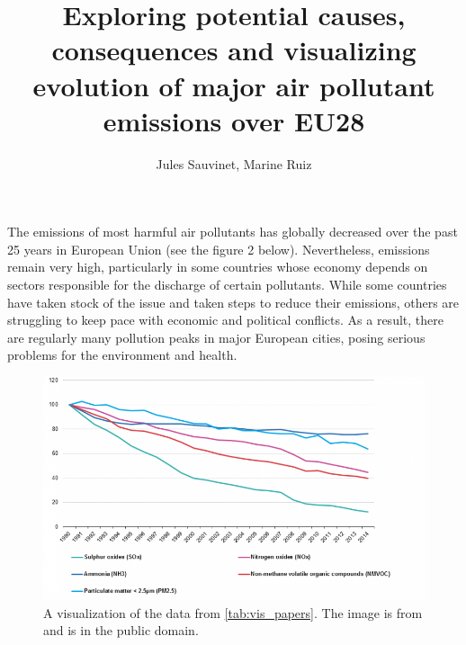 \documentclass[preprint,journal]{vgtc}       %
\title{Exploring potential causes, consequences and visualizing evolution of major air pollutant emissions over EU28}
\author{Jules Sauvinet, Marine Ruiz}
\begin{document}


\maketitle

\paragraph{}
The emissions of most harmful air pollutants has globally decreased over the past 25 years in European Union (see the figure 2 below).
Nevertheless, emissions remain very high, particularly in some countries whose economy depends on sectors responsible for the discharge of certain pollutants. While some countries have taken stock of the issue and taken steps to reduce their emissions, others are struggling to keep pace with economic and political conflicts.
As a result, there are regularly many pollution peaks in major European cities, posing serious problems for the environment and health.

\begin{figure}[H]
 \centering %
 \includegraphics[width=\columnwidth]{decreased_emissions}
 \caption{A visualization of the data from \autoref{tab:vis_papers}. The image is from \cite{Eurostats:2016:VMC} and is in the public domain.}
 \label{fig:pollution decrease}
\end{figure}
\end{document}
